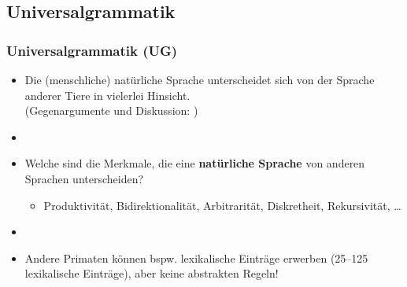 \subsection{Universalgrammatik}


\begin{frame}
\frametitle{Universalgrammatik (UG)}

\begin{itemize}

	\item Die (menschliche) natürliche Sprache unterscheidet sich von der Sprache anderer Tiere in vielerlei Hinsicht. \citep[vgl. \zB ][]{Hockett60a, Pinker95a}\\
	(Gegenargumente und Diskussion: \citet{Evans&Levinson09a, MuellerS15b})
	\item[]
	\item Welche sind die Merkmale, die eine \textbf{natürliche Sprache} von anderen Sprachen unterscheiden? 
	\begin{itemize}
		\item Produktivität, Bidirektionalität, Arbitrarität, Diskretheit, Rekursivität, \dots \citep[vgl.][]{Luedeling2009a}
	\end{itemize}
	\item[]
	\item Andere Primaten können bspw. lexikalische Einträge erwerben (25--125 lexikalische Einträge), aber keine abstrakten Regeln!
\end{itemize}

\end{frame}


